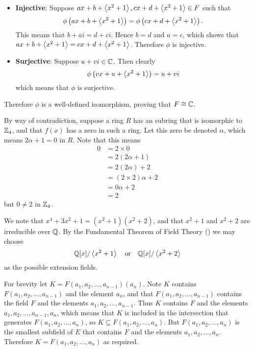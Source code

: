 \begin{questions}
\begin{itemize}
        \item \textbf{Injective}: Suppose $ax + b + \left\langle x^2+1\right\rangle, cx + d + \left\langle x^2+1\right\rangle \in F$ such that
        \[
            \phi\left(ax + b + \left\langle x^2+1\right\rangle\right) = \phi\left(cx + d + \left\langle x^2+1\right\rangle\right).
        \]
        This means that $b + ai = d + ci$. Hence $b = d$ and $a = c$, which shows that $ax + b + \left\langle x^2+1\right\rangle = cx + d + \left\langle x^2+1\right\rangle$. Therefore $\phi$ is injective.

        \item \textbf{Surjective}: Suppose $u + vi \in \mathbb{C}$. Then clearly
        \[
            \phi\left(vx + u + \left\langle x^2+1\right\rangle\right) = u + vi
        \]
        which means that $\phi$ is surjective.
    \end{itemize}
    Therefore $\phi$ is a well-defined isomorphism, proving that $F \cong \mathbb{C}$.

    \item By way of contradiction, suppose a ring $R$ has an subring that is isomorphic to $\mathbb{Z}_4$, and that $f(x)$ has a zero in such a ring. Let this zero be denoted $\alpha$, which means $2\alpha + 1 = 0$ in $R$. Note that this means
    \begin{align*}
        0 &= 2\times0\\
        &= 2(2\alpha + 1)\\
        &= 2(2\alpha) + 2\\
        &= (2 \times 2)\alpha + 2\\
        &= 0\alpha + 2\\
        &= 2
    \end{align*}
    but $0 \neq 2$ in $\mathbb{Z}_4$.

    \item We note that $x^4 + 3x^2 + 1 = (x^2+1)(x^2+2)$, and that $x^2+1$ and $x^2 + 2$ are irreducible over $\mathbb{Q}$. By the Fundamental Theorem of Field Theory () we may choose
    \[
        \mathbb{Q}[x]/\left\langle x^2+1\right\rangle \quad\text{or}\quad \mathbb{Q}[x]/\left\langle x^2+2\right\rangle
    \]
    as the possible extension fields.

    \item For brevity let $K = F(a_1, a_2, \dots, a_{n-1})(a_n)$. Note $K$ contains $F(a_1, a_2, \dots, a_{n-1})$ and the element $a_n$, and that $F(a_1, a_2, \dots, a_{n-1})$ contains the field $F$ and the elements $a_1, a_2, \dots, a_{n-1}$. Thus $K$ contains $F$ and the elements $a_1, a_2, \dots, a_{n-1}, a_n$, which means that $K$ is included in the intersection that generates $F(a_1, a_2, \dots, a_n)$, so $K \subseteq F(a_1, a_2, \dots, a_n)$. But $F(a_1, a_2, \dots, a_n)$ is the smallest subfield of $E$ that contains $F$ and the elements $a_1, a_2, \dots, a_n$. Therefore $K = F(a_1, a_2, \dots, a_n)$ as required.


\end{questions}
